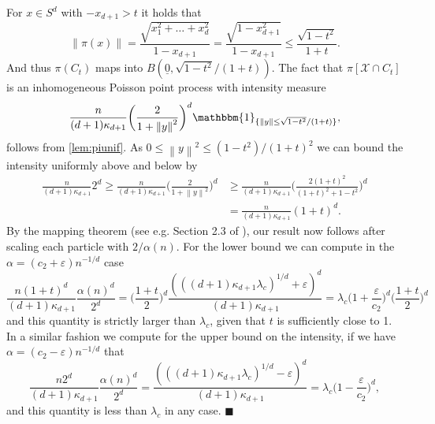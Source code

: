 \documentclass[11pt]{article}%
\newenvironment{proof}{\vspace{1ex}\noindent{\bf Proof.}}{\hspace*{\fill}$\blacksquare$\vspace{1ex}}
\newcommand{\norm}[1]{\ensuremath{\left\|#1\right\|}}
\newcommand{\eps}{\varepsilon}
\newcommand{\indicator}[1]{\mathbbm{1}_{\{#1\}}}
\newcommand{\typ}{\underline{0}}
\begin{document}
\begin{proof}
	For $ x\in S^d $ with $ -x_{d+1}>t $ it holds that
	\begin{equation*}
		\norm{\pi(x)}=\frac{\sqrt{x_1^2+\dots+x_d^2}}{1-x_{d+1}}=\frac{\sqrt{1-x^2_{d+1}}}{1-x_{d+1}} \leq \frac{\sqrt{1-t^2}}{1+t}.
	\end{equation*}
	And thus $ \pi(C_t) $ maps into $ B(\typ,\sqrt{1-t^2}/(1+t)) $. 
	The fact that $ \pi[\mathcal{X}\cap C_t] $ is an inhomogeneous Poisson point process with intensity measure
	\begin{equation*}
		\frac{n}{(d+1)\kappa_{d+1}}\bigg(\frac{2}{1+\norm{y}^2}\bigg)^d\indicator{\norm{y}\leq \sqrt{1-t^2}/(1+t)},
	\end{equation*}
	follows from \cref{lem:piunif}. As $ 0\leq\norm{y}^2\leq (1-t^2)/(1+t)^2  $ we can bound the intensity uniformly above and below by
	\begin{equation*}
    \begin{split}
        \frac{n}{(d+1)\kappa_{d+1}}2^d\geq \frac{n}{(d+1)\kappa_{d+1}}\bigg(\frac{2}{1+\norm{y}^2}\bigg)^d&\geq \frac{n}{(d+1)\kappa_{d+1}}\bigg(\frac{2(1+t)^2}{(1+t)^2+1-t^2}\bigg)^d\\&= \frac{n  }{(d+1)\kappa_{d+1}}(1+t)^d.
    \end{split}
	\end{equation*}
	By the mapping theorem (see e.g. Section 2.3 of \cite{Kingmanboek}), our result now follows after scaling each 
	particle with $  2/\alpha(n)$. For the lower bound we can compute in the $\alpha=(c_2+\eps)n^{-1/d}$ case
    \begin{equation*}
         \frac{n (1+t)^d }{(d+1)\kappa_{d+1}} \frac{\alpha(n)^d}{2^d} = 
         \bigg(\frac{1+t}{2}\bigg)^d \frac{(((d+1)\kappa_{d+1}\lambda_c)^{1/d}+\eps)^d}{(d+1)\kappa_{d+1}}
         =\lambda_c \bigg(1+\frac{\eps}{c_2}\bigg)^d\bigg(\frac{1+t}{2}\bigg)^d
    \end{equation*}
    and this quantity is strictly larger than $\lambda_c$, given that $t$ is sufficiently close to 1. In a similar fashion we compute for the upper bound on the intensity, if we have 
    $\alpha=(c_2-\eps)n^{-1/d}$ that
    \begin{equation*}
        \frac{n2^d}{(d+1)\kappa_{d+1}}\frac{\alpha(n)^d}{2^d} 
        =\frac{(((d+1)\kappa_{d+1}\lambda_c)^{1/d}-\eps)^d}{(d+1)\kappa_{d+1}}
        =\lambda_c\bigg(1-\frac{\eps}{c_2}\bigg)^d,
    \end{equation*}
    and this quantity is less than $\lambda_c$ in any case.
\end{proof}
\end{document}
